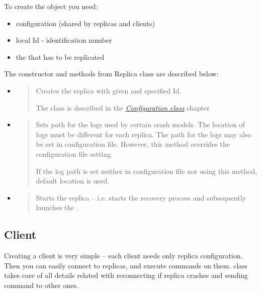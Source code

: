 To create the  object you need:
\begin{itemize}
\item {} 
configuration (shared by replicas and clients)

\item {} 
local Id - identification number

\item {} 
the  that has to be replicated

\end{itemize}

The constructor and methods from Replica class are described below:
\begin{itemize}
\item {} 
\begin{quote}

Creates the replica with given  and specified Id.

The  class is described in the {\hyperref[config:jpaxos-configclass]{\emph{Configuration class}}} chapter
\end{quote}

\item {} 
\begin{quote}

Sets path for the logs used by certain crash models. The location of logs must be different for each replica. The path for the logs may also be set in configuration file. However, this method overrides the configuration file setting.

If the log path is set neither in configuration file nor using this method, default  location is used.
\end{quote}

\item {} 
\begin{quote}

Starts the replica -- i.e. starts the recovery process and subsequently launches the .
\end{quote}

\end{itemize}


\subsection{Client}
\label{api:jpaxos-client}\label{api:client}
Creating a client is very simple -- each client needs only replica configuration. Then you can easily connect to replicas, and execute commands on them.  class takes care of all details related with reconnecting if replica crashes and sending command to other ones.

